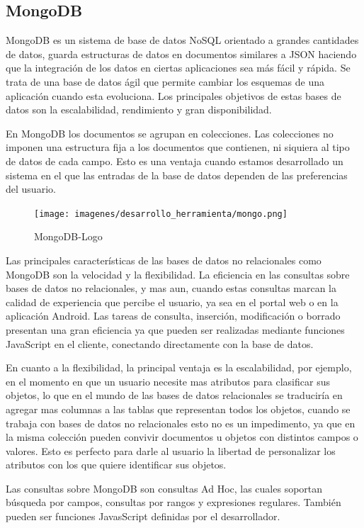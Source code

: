 \documentclass[a4paper,11pt]{book}
\begin{document}
\subsection{MongoDB}

MongoDB\cite{mg} es un sistema de base de datos NoSQL orientado a grandes cantidades de datos, guarda estructuras de datos en documentos similares a JSON haciendo que la integración de los datos en ciertas aplicaciones sea más fácil y rápida.
Se trata de una base de datos ágil que permite cambiar los esquemas de una aplicación cuando esta evoluciona. Los principales objetivos de estas bases de datos son la escalabilidad, rendimiento y gran disponibilidad.

En MongoDB los documentos se agrupan en colecciones. Las colecciones  no imponen una estructura fija a los documentos que contienen, ni siquiera al tipo de datos de cada campo. Esto es una ventaja cuando estamos desarrollado un sistema en el que las entradas de la base de datos dependen de las preferencias del usuario.

\begin{figure}[H] 
\centering 
\texttt{[image: imagenes/desarrollo\_herramienta/mongo.png]}
\caption{ MongoDB-Logo\cite{mongoL}  }  
\end{figure} 

Las principales características de las bases de datos no relacionales como MongoDB son la velocidad y la flexibilidad. La eficiencia en las consultas sobre bases de datos no relacionales, y mas aun, cuando estas consultas marcan la calidad de experiencia que percibe el usuario, ya sea en el portal web o en la aplicación Android.  Las tareas de consulta, inserción, modificación o borrado presentan una gran eficiencia ya que pueden ser realizadas mediante funciones JavaScript en el cliente, conectando directamente con la base de datos.

En cuanto a la flexibilidad, la principal ventaja es la escalabilidad, por ejemplo, en el momento en que un usuario necesite mas atributos para clasificar sus objetos, lo que en el mundo de las bases de datos relacionales se traduciría en agregar mas columnas a las tablas que representan todos los objetos, cuando se trabaja con bases de datos no relacionales esto no es un impedimento, ya que en la misma colección pueden convivir documentos u objetos con distintos campos o valores. Esto es perfecto para darle al usuario la libertad de personalizar los atributos con los que quiere identificar sus objetos. 

Las consultas sobre MongoDB son consultas Ad Hoc, las cuales soportan búsqueda por campos, consultas por rangos y expresiones regulares. También pueden ser funciones JavasScript definidas por el desarrollador. 
\end{document}

